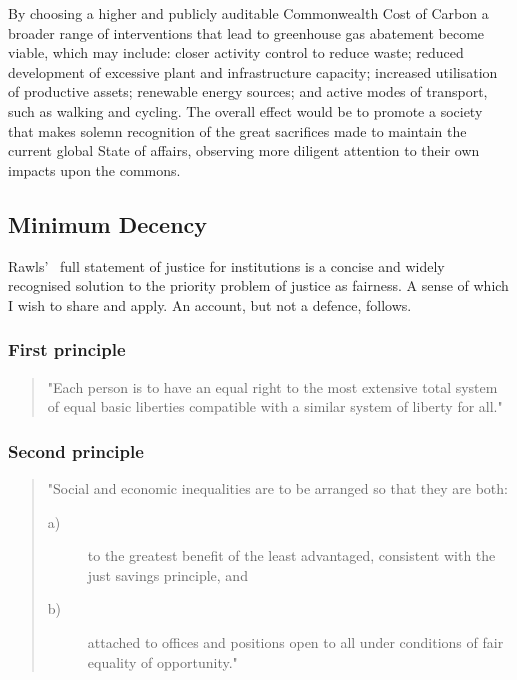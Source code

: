 \documentclass[11pt, oneside]{article}   	%
\begin{document}
By choosing a higher and publicly auditable Commonwealth Cost of Carbon a broader range of interventions that lead to greenhouse gas abatement become viable, which may include: closer activity control to reduce waste; reduced development of excessive plant and infrastructure capacity; increased utilisation of productive assets; renewable energy sources; and active modes of transport, such as walking and cycling.
The overall effect would be to promote a society that makes solemn recognition of the great sacrifices made to maintain the current global State of affairs, observing more diligent attention to their own impacts upon the commons.\

\subsection{Minimum Decency}

Rawls'~\cite{jr1} full statement of justice for institutions is a concise and widely recognised solution to the priority problem of justice as fairness. A sense of which I wish to share and apply. An account, but not a defence, follows.

\subsubsection{First principle}

\begin{quote}
"Each person is to have an equal right to the most extensive total system of equal basic liberties compatible with a similar system of liberty for all."
\end{quote}

\subsubsection{Second principle}

\begin{quote}
"Social and economic inequalities are to be arranged so that they are both:
\begin{description}
\item[ a)] to the greatest benefit of the least advantaged, consistent with the just savings principle, and
\item[ b)] attached to offices and positions open to all under conditions of fair equality of opportunity."
\end{description}
\end{quote}
\end{document}
